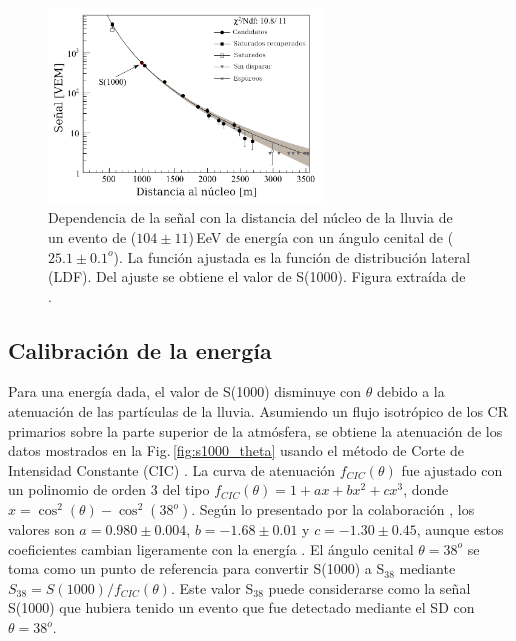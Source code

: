 \begin{figure}[H]
	\begin{small}
		\begin{center}
			\includegraphics[width=0.65\textwidth]{evento_s1000.png}
		\end{center}
		\caption{Dependencia de la señal con la distancia del núcleo de la lluvia de un evento de ($104\pm11$)\,EeV de energía con un ángulo cenital de ($25.1\pm0.1 ^o$). La función ajustada es la función de distribución lateral (LDF). Del ajuste se obtiene el valor de S(1000). Figura extraída de \cite{como_funciona_auger}. } 	\label{fig:evento_S1000}
	\end{small}
\end{figure}


\subsection{Calibración de la energía}

Para una energía dada, el valor de S(1000) disminuye con $\theta$ debido a la atenuación de las partículas de la lluvia. Asumiendo un flujo isotrópico de los CR primarios sobre la parte superior de la atmósfera, se obtiene la atenuación de los datos mostrados en la Fig.\,\ref{fig:s1000_theta}  usando el método de Corte de Intensidad Constante (CIC) \cite{CIC}. La curva de atenuación $f_{CIC}(\theta)$ fue ajustado con un polinomio de orden 3 del tipo $f_{CIC}(\theta)=1+ax+bx^2+cx^3$, donde $x=\cos^2(\theta) - \cos^2(38^o)$. Según lo presentado por la colaboración \cite{collaboration2013pierre}, los valores son $a=0.980\pm0.004$, $b=-1.68\pm0.01$ y $c=-1.30\pm 0.45$, aunque estos coeficientes cambian ligeramente con la energía \cite{data}. El ángulo cenital $\theta=38^o$ se toma como un punto de referencia para convertir S(1000) a S$_{38}$ mediante $S_{38}=S(1000)/f_{CIC}(\theta)$. Este valor S$_{38}$ puede considerarse como la señal S(1000) que hubiera tenido un evento que fue detectado mediante el SD con $\theta=38^o$.

